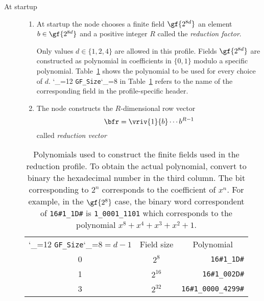 \documentclass{rfc}
\def\ttt{\catcode`\_=12 \tttii}
\def\tttii#1!{{\tt #1}\catcode`\_=8{}}
\begin{document}
\begin{description}
\item[At startup] 
  \begin{enumerate}
    \item
      At startup the node chooses a finite field
$\gf{2^{8d}}$ an element $b \in \gf{2^{8d}}$ and a positive integer $R$
called the \emph{reduction factor}.  
\begin{commento}
Only values $d \in \{1,2,4\}$
are allowed in this profile.  Fields $\gf{2^{8d}}$ are constructed as
polynomial in coefficients in $\{0,1\}$ modulo a specific polynomial.
Table~\ref{table:poly} shows the polynomial to be used for every
choice of $d$.  \ttt GF_Size! in Table~\ref{table:poly} refers to the
name of the corresponding field in the profile-specific header.    
\end{commento}
   \item
The node constructs the
$R$-dimensional row vector
%
\begin{equation}
\label{eq:0;driver}
\bfr = \vriv{1}{b} \cdots {b^{R-1}}
\end{equation}
%
called \emph{reduction vector}
  \end{enumerate}

\begin{table}
\caption{Polynomials used to construct the finite fields used in the
  reduction profile. To obtain the actual polynomial, convert to
  binary the hexadecimal number in the third column.  The bit
  corresponding to $2^n$ corresponds to the coefficient of $x^n$.  For
  example, in the $\gf{2^{8}}$ case, the binary word correspondent of
  \texttt{16\#1\_1D\#} is \texttt{1\_0001\_1101} which corresponds to
  the polynomial $x^{8} + x^4 + x^3 + x^2 + 1$.
 \label{table:poly}}
\begin{center}
\begin{tabular}{ccr}
  \ttt GF_Size!$=d-1$ & Field size & 
\multicolumn{1}{c}{Polynomial} \\
  0  & $2^8$    & \texttt{16\#1\_1D\#}\\
  1  & $2^{16}$ & \texttt{16\#1\_002D\#} \\
  3  & $2^{32}$ & \texttt{16\#1\_0000\_4299\#}
\end{tabular}
\end{center}
\end{table}


\end{description}
\end{document}

